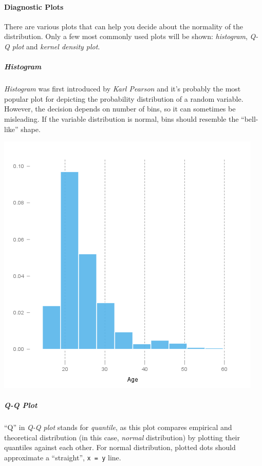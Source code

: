 \documentclass[]{article}
\makeatletter
\def\maxwidth{\ifdim\Gin@nat@width>\linewidth\linewidth
\else\Gin@nat@width\fi}
\let\Oldincludegraphics\includegraphics
\renewcommand{\includegraphics}[1]{\Oldincludegraphics[width=\maxwidth]{#1}}
\makeatother
\begin{document}
\paragraph{Diagnostic Plots}

There are various plots that can help you decide about the normality of
the distribution. Only a few most commonly used plots will be shown:
\emph{histogram}, \emph{Q-Q plot} and \emph{kernel density plot}.

\subparagraph{Histogram}

\emph{Histogram} was first introduced by \emph{Karl Pearson} and it's
probably the most popular plot for depicting the probability
distribution of a random variable. However, the decision depends on
number of bins, so it can sometimes be misleading. If the variable
distribution is normal, bins should resemble the ``bell-like'' shape.

\href{4f025d440bf35d40e21208e8b0c58b77-hires.png}{\includegraphics{4f025d440bf35d40e21208e8b0c58b77.png}}

\subparagraph{Q-Q Plot}

``Q'' in \emph{Q-Q plot} stands for \emph{quantile}, as this plot
compares empirical and theoretical distribution (in this case,
\emph{normal} distribution) by plotting their quantiles against each
other. For normal distribution, plotted dots should approximate a
``straight'', \texttt{x = y} line.
\end{document}
